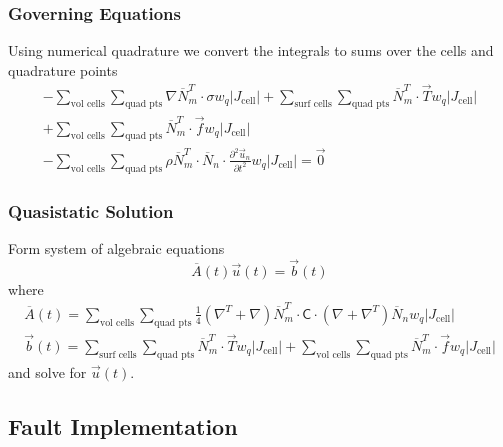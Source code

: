 \documentclass{beamer}
\newcommand{\tensor}[1]{\overline{#1}}
\begin{document}
\begin{frame}
  \frametitle{Governing Equations}
  \summary{}

  Using numerical quadrature we convert the integrals to sums over the
  cells and quadrature points
  \begin{multline}
    -\sum_\text{vol cells} \sum_\text{quad pts} \nabla \tensor{N}_m^T \cdot \mathsf{\sigma} w_q |J_\text{cell}|
    + \sum_\text{surf cells} \sum_\text{quad pts} \tensor{N}_m^T \cdot \vec{T} w_q |J_\text{cell}|\\
    + \sum_\text{vol cells} \sum_\text{quad pts}  \tensor{N}_m^T \cdot \vec{f} w_q |J_\text{cell}|\\
    - \sum_\text{vol cells} \sum_\text{quad pts} \rho \tensor{N}_m^T \cdot \tensor{N}_n \cdot \frac{\partial^2 \vec{u}_n}{\partial
  t^2} w_q |J_\text{cell}| = \vec{0}    
  \end{multline}

\end{frame}


\begin{frame}
  \frametitle{Quasistatic Solution}

  \vfill
  Form system of algebraic equations
  \begin{equation}
    \tensor{A} (t) \vec{u}(t) = \vec{b}(t)
  \end{equation}
  where
  \begin{gather}
    \tensor{A} (t) = \sum_\text{vol cells} \sum_\text{quad pts} 
    \frac{1}{4} (\nabla^T + \nabla) \tensor{N}_m^T \cdot \mathsf{C} 
    \cdot (\nabla + \nabla^T) \tensor{N}_n w_q |J_\text{cell}| \\
    \vec{b}(t) =    
     \sum_\text{surf cells} \sum_\text{quad pts} \tensor{N}_m^T \cdot
     \vec{T} w_q |J_\text{cell}| 
    + \sum_\text{vol cells} \sum_\text{quad pts}  \tensor{N}_m^T \cdot
    \vec{f} w_q |J_\text{cell}|
\end{gather}
  and solve for $\vec{u}(t)$.
  \vfill


\end{frame}


\subsection{Fault Implementation}
\end{document}

